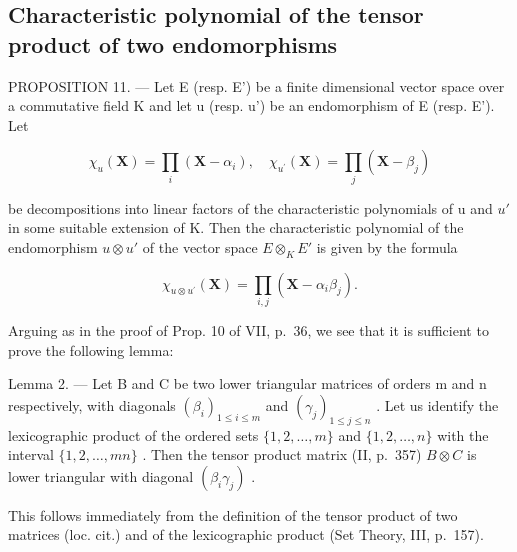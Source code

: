 \subsection{Characteristic polynomial of the tensor product of two endomorphisms}

PROPOSITION 11. --- Let E (resp. E') be a finite dimensional vector space over a commutative field K and let u (resp. u') be an endomorphism of E (resp. E'). Let

\[
\chi_ {u} (\mathbf {X}) = \prod_ {i} \left(\mathbf {X} - \alpha_ {i}\right), \quad \chi_ {u ^ {\prime}} (\mathbf {X}) = \prod_ {j} \left(\mathbf {X} - \beta_ {j}\right)
\]

be decompositions into linear factors of the characteristic polynomials of u and \(u'\) in some suitable extension of K. Then the characteristic polynomial of the endomorphism \(u \otimes u'\) of the vector space \(E \otimes_{K} E'\) is given by the formula

\[
\chi_ {u \otimes u ^ {\prime}} (\mathbf {X}) = \prod_ {i, j} \left(\mathbf {X} - \alpha_ {i} \beta_ {j}\right).
\]

Arguing as in the proof of Prop. 10 of VII, p.~36, we see that it is sufficient to prove the following lemma:

Lemma 2. --- Let B and C be two lower triangular matrices of orders m and n respectively, with diagonals \((\beta_{i})_{1\leq i\leq m}\) and \((\gamma_{j})_{1\leq j\leq n}\) . Let us identify the lexicographic product of the ordered sets \(\{1,2,\ldots,m\}\) and \(\{1,2,\ldots,n\}\) with the interval \(\{1,2,\ldots,mn\}\) . Then the tensor product matrix (II, p.~357) \(B\otimes C\) is lower triangular with diagonal \((\beta_{i}\gamma_{j})\) .

This follows immediately from the definition of the tensor product of two matrices (loc. cit.) and of the lexicographic product (Set Theory, III, p.~157).

